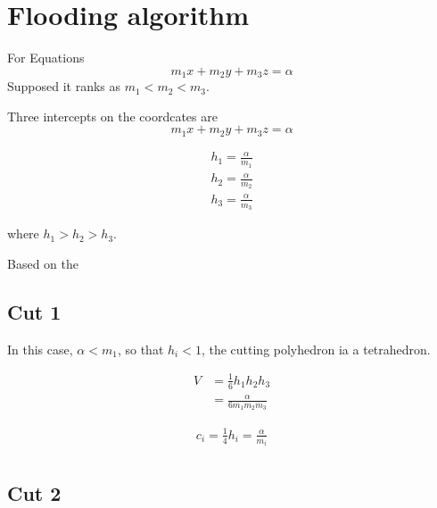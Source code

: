 \documentclass{article}
\begin{document}
\section{Flooding algorithm}
For Equations
\begin{equation}
  \label{eq:cut-1}
  m_{1}x+m_{2}y+m_{3}z = \alpha
\end{equation}
Supposed it ranks as $m_{1}<m_{2}<m_{3}$.

Three intercepts on the coordcates are
\begin{equation}
  \label{eq:cut-1}
  m_{1}x+m_{2}y+m_{3}z = \alpha
\end{equation}

\begin{equation}
  \begin{aligned}
  \label{eq:cut-1}
  h_{1} = \frac{\alpha}{m_{1}} \\
  h_{2} = \frac{\alpha}{m_{2}} \\
  h_{3} = \frac{\alpha}{m_{3}}
  \end{aligned}
\end{equation}

where $h_{1} > h_{2} > h_{3}$.

Based on the 

\subsection{Cut 1}

In this case, $\alpha < m_{1}$, so that $h_{i}<1$, the cutting polyhedron ia a tetrahedron.

\begin{equation}
\begin{aligned}
\label{eq:cut1}
V &= \frac{1}{6}h_{1}h_{2}h_{3} \\
& = \frac{\alpha}{6m_{1}m_{2}m_{3}}
\end{aligned}
\end{equation}

\begin{equation}
\begin{aligned}
\label{eq:cut1}
  c_{i}= \frac{1}{4}h_{i} = \frac{\alpha}{m_{i}}\\
\end{aligned}
\end{equation}

\subsection{Cut 2}
\end{document}
